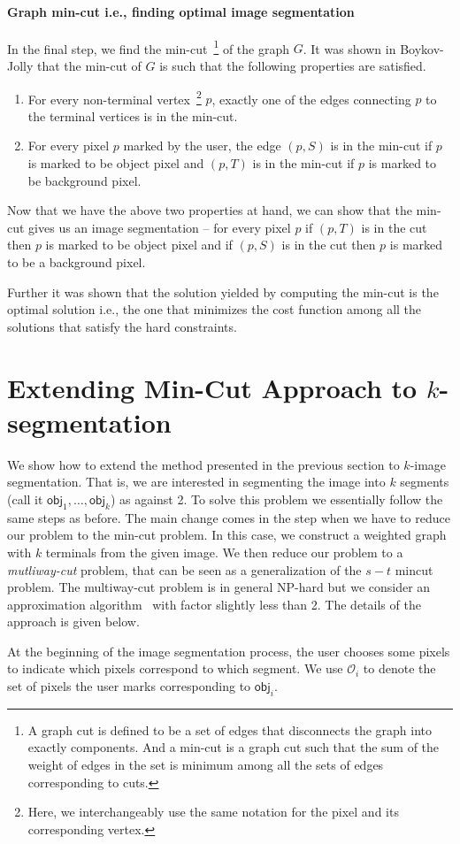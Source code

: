 \documentclass{acm}
\newcommand{\setobj}{\mathcal{O}}
\newcommand{\obj}{\mathsf{obj}}
\begin{document}
\paragraph{Graph min-cut i.e., finding optimal image segmentation} In the final step, we find the min-cut~\footnote{A graph cut is defined to be a set of edges that disconnects the graph into exactly components. And a min-cut is a graph cut such that the sum of the weight of edges in the set is minimum among all the sets of edges corresponding to cuts.} of the graph $G$. It was shown in Boykov-Jolly that the min-cut of $G$ is such that the following properties are satisfied. 
\begin{enumerate}
\item For every non-terminal vertex~\footnote{Here, we interchangeably use the same notation for the pixel and its corresponding vertex.} $p$, exactly one of the edges connecting $p$ to the terminal vertices is in the min-cut. 
\item For every pixel $p$ marked by the user, the edge $(p,S)$ is in the min-cut if $p$ is marked to be object pixel and $(p,T)$ is in the min-cut if $p$ is marked to be background pixel. 
\end{enumerate}
\noindent Now that we have the above two properties at hand, we can show that the min-cut gives us an image segmentation -- for every pixel $p$ if $(p,T)$ is in the cut then $p$ is marked to be object pixel and if $(p,S)$ is in the cut then $p$ is marked to be a background pixel. 
\par Further it was shown that the solution yielded by computing the min-cut is the optimal solution i.e., the one that minimizes the cost function among all the solutions that satisfy the hard constraints. 

\section{Extending Min-Cut Approach to $k$-segmentation}
\noindent We show how to extend the method presented in the previous section to $k$-image segmentation. That is, we are interested in segmenting the image into $k$ segments (call it $\obj_1,\ldots,\obj_k$) as against 2. To solve this problem we essentially follow the same steps as before. The main change comes in the step when we have to reduce our problem to the min-cut problem. In this case, we construct a weighted graph with $k$ terminals from the given image. We then reduce our problem to a \textit{mutliway-cut} problem, that can be seen as a generalization of the $s-t$ mincut problem. The multiway-cut problem is in general NP-hard but we consider an approximation algorithm~\cite{} with factor slightly less than 2. The details of the approach is given below. 
\par At the beginning of the image segmentation process, the user chooses some pixels to indicate which pixels correspond to which segment. We use $\setobj_i$ to denote the set of pixels the user marks corresponding to $\obj_i$. 
\end{document}

